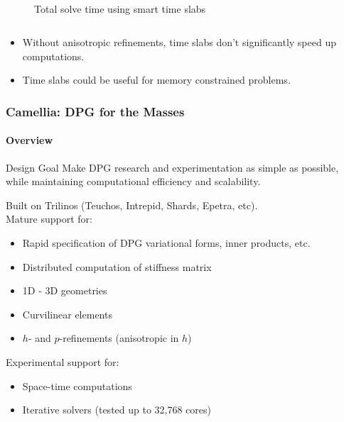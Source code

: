 \documentclass[18pt,xcolor=table]{beamer}
\newcounter{nn}
\begin{document}
\begin{frame}
\begin{columns}
\begin{column}{0.5\textwidth}
\begin{figure}
\\Total solve time using smart time slabs
\end{figure}
\end{column}
\end{columns}
\begin{itemize}
  \item Without anisotropic refinements, time slabs don't significantly speed up computations.
  \item Time slabs could be useful for memory constrained problems.
\end{itemize}
\end{frame}





\begin{frame}[fragile]
\frametitle{Camellia: DPG for the Masses}
\framesubtitle{Overview}  %
\begin{block}{Design Goal}
Make DPG research and experimentation as simple as possible, while maintaining computational efficiency and scalability.
\end{block}
Built on Trilinos (Teuchos, Intrepid, Shards, Epetra, etc).\\
Mature support for:
\begin{itemize}
  \item Rapid specification of DPG variational forms, inner products, etc.
  \item Distributed computation of stiffness matrix
  \item 1D - 3D geometries
  \item Curvilinear elements
  \item $h$- and $p$-refinements (anisotropic in $h$)
\end{itemize}
Experimental support for:
\begin{itemize}
  \item Space-time computations
  \item Iterative solvers (tested up to 32,768 cores)
\end{itemize}
\end{frame}
\end{document}
